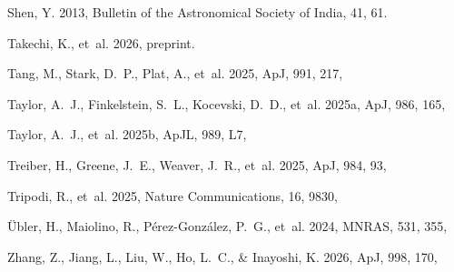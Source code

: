 \documentclass[pdflatex,sn-basic]{sn-jnl}
\providecommand{\bibinfo}[2]{}
\renewcommand{\bibinfo}[2]{}
\begin{document}
\begin{thebibliography}{}
Shen, Y. 2013, \bibinfo{title}{The Mass of Quasars,} Bulletin of the
  Astronomical Society of India, 41, 61.
\newblock {}

Takechi, K., {et~al.} 2026, \bibinfo{title}{DREAMS. JWST Spectroscopy of a
z=8.3 Galaxy with an ALMA Dust Continuum Detection,} preprint.
\newblock {}

Tang, M., Stark, D.~P., Plat, A., {et~al.} 2025, \bibinfo{title}{JWST/NIRSpec
  Observations of High-ionization Emission Lines in Galaxies at High Redshift,}
  ApJ, 991, 217, 

Taylor, A.~J., Finkelstein, S.~L., Kocevski, D.~D., {et~al.} 2025a,
  \bibinfo{title}{Broad-line AGNs at 3.5 < z < 6: The Black Hole Mass Function
  and a Connection with Little Red Dots,} ApJ, 986, 165,

Taylor, A.~J., {et~al.} 2025b, \bibinfo{title}{CAPERS-LRD-z9: A Gas Enshrouded
Little Red Dot Hosting a Broad-line AGN at z=9.288,} ApJL, 989, L7,

Treiber, H., Greene, J.~E., Weaver, J.~R., {et~al.} 2025,
  \bibinfo{title}{UNCOVERing the High-redshift AGN Population among Extreme UV
  Line Emitters,} ApJ, 984, 93, 

Tripodi, R., {et~al.} 2025, \bibinfo{title}{Extreme properties of a compact and
massive accreting black hole host in the first 500 Myr,} Nature Communications,
16, 9830, 

{\"{U}}bler, H., Maiolino, R., P{\'{e}}rez-Gonz{\'{a}}lez, P.~G., {et~al.}
  2024, \bibinfo{title}{GA-NIFS: JWST discovers an offset AGN 740 million years
  after the big bang,} MNRAS, 531, 355, 

Zhang, Z., Jiang, L., Liu, W., Ho, L.~C., \& Inayoshi, K. 2026,
  \bibinfo{title}{JWST Insights into Narrow-line Little Red Dots,} ApJ, 998,
  170, 


\end{thebibliography}
\end{document}
